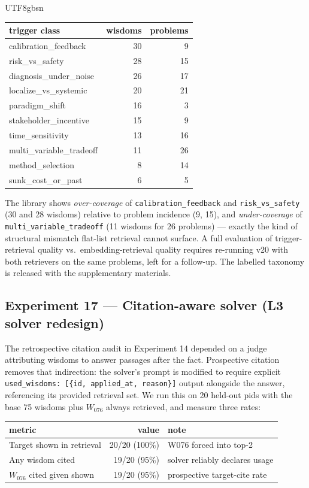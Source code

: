 \documentclass{article}
\begin{document}
\begin{CJK*}{UTF8}{gbsn}
\begin{center}\small
\begin{tabular}{l r r}
  \toprule
  trigger class & wisdoms & problems \\
  \midrule
  calibration\_feedback   & 30 & 9 \\
  risk\_vs\_safety        & 28 & 15 \\
  diagnosis\_under\_noise & 26 & 17 \\
  localize\_vs\_systemic  & 20 & 21 \\
  paradigm\_shift         & 16 & 3 \\
  stakeholder\_incentive  & 15 & 9 \\
  time\_sensitivity       & 13 & 16 \\
  multi\_variable\_tradeoff & 11 & 26 \\
  method\_selection       &  8 & 14 \\
  sunk\_cost\_or\_past    &  6 & 5 \\
  \bottomrule
\end{tabular}
\end{center}

The library shows \emph{over-coverage} of
\texttt{calibration\_feedback} and \texttt{risk\_vs\_safety} (30
and 28 wisdoms) relative to problem incidence (9, 15), and
\emph{under-coverage} of \texttt{multi\_variable\_tradeoff}
(11 wisdoms for 26 problems) — exactly the kind of structural
mismatch flat-list retrieval cannot surface. A full
evaluation of trigger-retrieval quality vs.\ embedding-retrieval
quality requires re-running v20 with both retrievers on the
same problems, left for a follow-up. The labelled taxonomy is
released with the supplementary materials.

\subsection{Experiment 17 — Citation-aware solver (L3 solver
redesign)}
\label{sec:l3}

The retrospective citation audit in Experiment 14 depended on a
judge attributing wisdoms to answer passages after the fact.
Prospective citation removes that indirection: the solver's
prompt is modified to require explicit
\texttt{used\_wisdoms: [\{id, applied\_at, reason\}]} output
alongside the answer, referencing its provided retrieval set.
We run this on 20 held-out pids with the base 75 wisdoms plus
\(W_{076}\) always retrieved, and measure three rates:

\begin{center}\small
\begin{tabular}{l r l}
  \toprule
  metric & value & note \\
  \midrule
  Target shown in retrieval & 20/20 (100\%) & W076 forced into top-2 \\
  Any wisdom cited          & 19/20 (95\%)  & solver reliably declares usage \\
  \(W_{076}\) cited given shown & 19/20 (95\%) & prospective target-cite rate \\
  \bottomrule
\end{tabular}
\end{center}


\end{CJK*}
\end{document}
